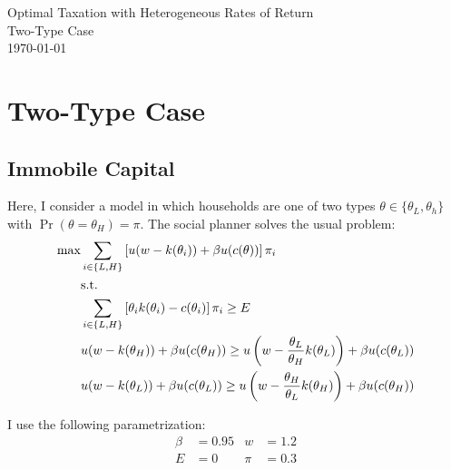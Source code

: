 \documentclass[11pt]{article}
\begin{document}
    \begin{flushleft}
        Optimal Taxation with Heterogeneous Rates of Return \\
        Two-Type Case \\
        \today
    \end{flushleft}

\section{Two-Type Case}
\subsection{Immobile Capital} \label{t2_imm}
Here, I consider a model in which households are one of two types \( \theta\in\{\theta_L, \theta_h\} \) with \( \Pr(\theta = \theta_H) = \pi \). The social planner solves the usual problem:
\begin{align}
    \max &\sum_{i \in\{L,H\}}\left[ u(w - k(\theta_i)) + \beta u(c(\theta)) \right]\pi_i \\ 
    &\text{s.t.} \notag \\
    &\sum_{i \in\{L,H\}}\left[ \theta_i k(\theta_i) - c(\theta_i) \right]\pi_i \ge E \\
    &u(w - k(\theta_H)) + \beta u(c(\theta_H)) \ge u\left( w - \frac{\theta_L}{\theta_H}k(\theta_L) \right) + \beta u(c(\theta_L)) \label{ic_H} \\
    &u(w - k(\theta_L)) + \beta u(c(\theta_L)) \ge u\left( w - \frac{\theta_H}{\theta_L}k(\theta_H) \right) + \beta u(c(\theta_H)) 
\end{align}

I use the following parametrization:
\begin{align*}
    \beta &= 0.95 & w &= 1.2\\
    E &= 0 & \pi &= 0.3
\end{align*}
\end{document}
